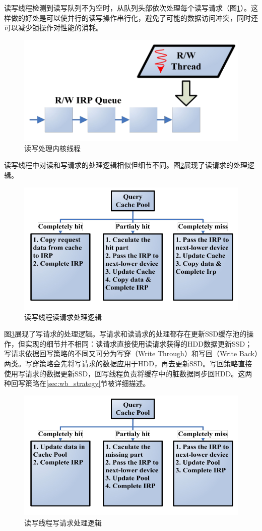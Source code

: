 \begin{enumerate}
读写线程检测到读写队列不为空时，从队列头部依次处理每个读写请求（图\ref{fig:df-rw-thread}）。这样做的好处是可以使并行的读写操作串行化，避免了可能的数据访问冲突，同时还可以减少锁操作对性能的消耗。

\begin{figure}[htb]
\centering
\includegraphics[width=0.5\linewidth]{./graph/df-rw-thread}
\caption{读写处理内核线程}
\label{fig:df-rw-thread}
\end{figure}

读写线程中对读和写请求的处理逻辑相似但细节不同。图\ref{fig:df-proc-read}展现了读请求的处理逻辑。

\begin{figure}[htb]
\centering
\includegraphics[width=0.75\linewidth]{./graph/df-proc-read}
\caption{读写线程读请求处理逻辑}
\label{fig:df-proc-read}
\end{figure}

图\ref{fig:df-proc-write}展现了写请求的处理逻辑。写请求和读请求的处理都存在更新SSD缓存池的操作，但实现的细节并不相同：读请求直接使用读请求获得的HDD数据更新SSD；写请求依据回写策略的不同又可分为写穿（Write Through）和写回（Write Back）两类。写穿策略会先将写请求的数据应用于HDD，再去更新SSD。写回策略直接使用写请求的数据更新SSD，回写线程负责将缓存中的脏数据同步回HDD。这两种回写策略在\ref{sec:wb_strategy}节被详细描述。

\begin{figure}[htb]
\centering
\includegraphics[width=0.75\linewidth]{./graph/df-proc-write}
\caption{读写线程写请求处理逻辑}
\label{fig:df-proc-write}
\end{figure}

\end{enumerate}

